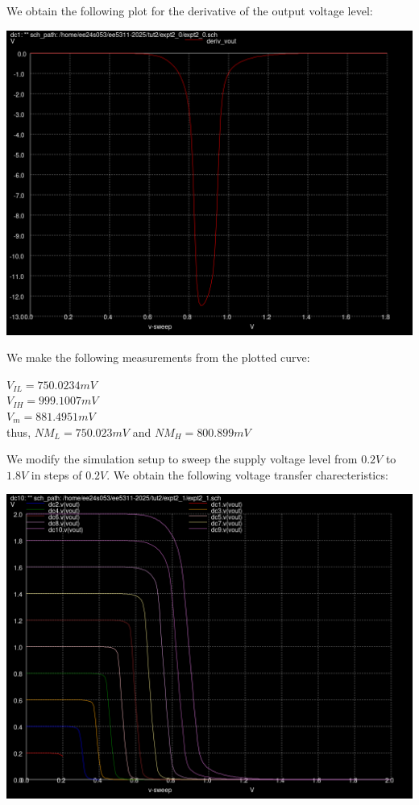 \documentclass[10pt,a4paper]{article}
\begin{document}
\noindent We obtain the following plot for the derivative of the output voltage level:
\begin{center}
\includegraphics[scale=0.3]{tut2/reports/media/expt2_0_deriv_vout.png}
\end{center}

\noindent We make the following measurements from the plotted curve:

\begin{center}
    $V_{IL} = 750.0234 mV$ \\
    $V_{IH} = 999.1007 mV$ \\
    $V_m = 881.4951 mV$ \\
    thus, $NM_L = 750.023 mV$ and $NM_H = 800.899 mV$
\end{center}

\noindent We modify the simulation setup to sweep the supply voltage level from $0.2V$ to $1.8V$ in steps of $0.2V$. We obtain the following voltage transfer charecteristics:
\begin{center}
\includegraphics[scale=0.3]{tut2/reports/media/expt2_1_vtc.png}
\end{center}
\end{document}
